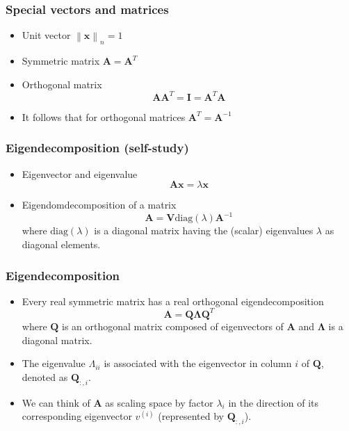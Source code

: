 \documentclass[notes]{beamer}          %
\newcommand{\vect}[1]{\bm{#1}}
\newcommand{\norm}[1]{\left\lVert#1\right\rVert}
\providecommand{\norm}[1]{\lVert#1\rVert}
\newif\iffull
\begin{document}
\begin{frame}
\frametitle{Special vectors and matrices}
    \begin{itemize}
        \item Unit vector $\norm{\vect{x}}_n = 1$
        \item Symmetric matrix $\vect{A} = \vect{A}^T$
        \item Orthogonal matrix $$\vect{A}\vect{A}^T = \vect{I} = \vect{A}^T \vect{A}$$
        \item It follows that for orthogonal matrices  $\vect{A}^T = \vect{A}^{-1}$
    \end{itemize}
\end{frame}

\begin{frame}
\iffull
\frametitle{Eigendecomposition}
\else
\frametitle{Eigendecomposition (self-study)}
\fi
    \begin{itemize}
        \item Eigenvector and eigenvalue
        $$ \vect{A}\vect{x} = \lambda \vect{x}$$
        \item Eigendomdecomposition of a matrix
        $$ \vect{A} = \vect{V} \mbox{diag}(\lambda) \vect{A}^{-1}$$
        where $\mbox{diag}(\lambda)$ is a diagonal matrix having the (scalar) eigenvalues $\lambda$ as diagonal elements.
    \end{itemize}

\end{frame}

\iffull
\begin{frame}
\frametitle{Eigendecomposition}
    \begin{itemize}
        \item Every real symmetric matrix has a real orthogonal eigendecomposition
        $$ \vect{A} = \vect{Q} \vect{\Lambda} \vect{Q}^T $$
        where $\vect{Q}$ is an orthogonal matrix composed of eigenvectors of $\vect{A}$ and $\vect{\Lambda}$ is a diagonal matrix.
        \item The eigenvalue $\Lambda_{ii}$ is associated with the eigenvector in column $i$ of $\vect{Q}$, denoted as $\vect{Q}_{:,i}$.
        \item We can think of $\vect{A}$ as scaling space by factor $\lambda_i$ in the direction of its corresponding eigenvector $v^{(i)}$ (represented by $\vect{Q}_{:,i}$).
    \end{itemize}

\end{frame}
\end{document}
